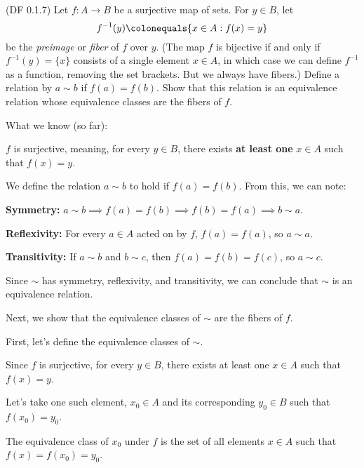 

\begin{problem}{\textsf{(DF 0.1.7)}}
  Let $f \colon A \to B$ be a surjective map of sets.  For $y \in B$, let
  \[ f^{-1}(y) \colonequals \{x \in A : f(x) = y\} \]
  be the \emph{preimage} or \emph{fiber} of $f$ over $y$.  (The map $f$ is bijective 
  if and only if $f^{-1}(y)=\{x\}$ consists of a single element $x \in A$, in which 
  case we can define $f^{-1}$ as a function, removing the set brackets.  But we 
  always have fibers.)
  Define a relation by $a \sim b$ if $f(a)=f(b)$.  Show that this relation is an 
  equivalence relation whose equivalence classes are the fibers of $f$.
\end{problem}
\begin{Answer}
  What we know (so far):
  \begin{enumalph}
    \item $f$ is surjective, meaning, for every $y \in B$, there exists
    \textbf{at least one} $x \in A$ such that $f(x)=y$.
    \item We define the relation $a \sim b$ to hold if $f(a)=f(b)$.
    From this, we can note:
    \begin{enumroman}
      \item \textbf{Symmetry: }$a \sim b \implies f(a)=f(b) \implies f(b) = f(a) \implies b \sim a$.
      \item \textbf{Reflexivity: } For every $a \in A$ acted on by $f$, $f(a)=f(a)$, so $a \sim a$.
      \item \textbf{Transitivity: } If $a \sim b$ and $b \sim c$, then $f(a)=f(b)=f(c)$, so $a \sim c$.
    \end{enumroman}
  \end{enumalph}

  \noindent
  Since $\sim$ has symmetry, reflexivity, and transitivity,
  we can conclude that $\sim$ is an equivalence relation.

  \bigskip
  \noindent
  Next, we show that the equivalence classes of $\sim$ are the fibers of $f$.

  \bigskip
  \noindent
  First, let's define the equivalence classes of $\sim$.

  \noindent
  Since $f$ is surjective, for every $y \in B$,
  there exists at least one $x \in A$ such that $f(x)=y$.

  \noindent
  Let's take one such element, $x_0 \in A$ and its corresponding $y_0 \in B$
  such that $f(x_0) = y_0$.
  
  
  \noindent
  The equivalence class of $x_0$ under $f$ is the set of all elements $x \in A$
  such that $f(x)=f(x_0)=y_0$.


\end{Answer}
